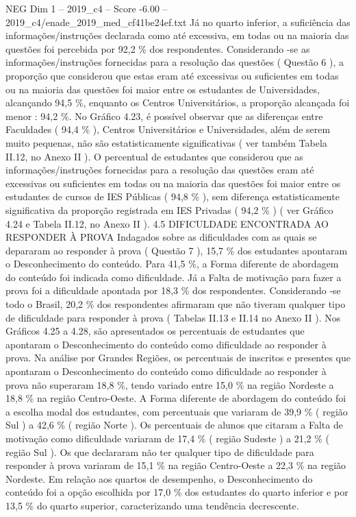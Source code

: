 \begin{textsample}{NEG Dim 1 – 2019\_c4 – Score -6.00 – 2019\_c4/enade\_2019\_med\_cf41be24ef.txt}
Já no quarto inferior, a suficiência das informações/instruções declarada como até excessiva, em todas ou na maioria das questões foi percebida por 92,2 \% dos respondentes.
Considerando -se as informações/instruções fornecidas para a resolução das questões ( Questão 6 ), a proporção que considerou que estas eram até excessivas ou suficientes em todas ou na maioria das questões foi maior entre os estudantes de Universidades, alcançando 94,5 \%, enquanto os Centros Universitários, a proporção alcançada foi menor : 94,2 \%.
No Gráfico 4.23, é possível observar que as diferenças entre Faculdades ( 94,4 \% ), Centros Universitários e Universidades, além de serem muito pequenas, não são estatisticamente significativas ( ver também Tabela II.12, no Anexo II ).
O percentual de estudantes que considerou que as informações/instruções fornecidas para a resolução das questões eram até excessivas ou suficientes em todas ou na maioria das questões foi maior entre os estudantes de cursos de IES Públicas ( 94,8 \% ), sem diferença estatisticamente significativa da proporção registrada em IES Privadas ( 94,2 \% ) ( ver Gráfico 4.24 e Tabela II.12, no Anexo II ). 4.5 DIFICULDADE ENCONTRADA AO RESPONDER À PROVA Indagados sobre as dificuldades com as quais se depararam ao responder à prova ( Questão 7 ), 15,7 \% dos estudantes apontaram o Desconhecimento do conteúdo.
Para 41,5 \%, a Forma diferente de abordagem do conteúdo foi indicada como dificuldade.
Já a Falta de motivação para fazer a prova foi a dificuldade apontada por 18,3 \% dos respondentes.
Considerando -se todo o Brasil, 20,2 \% dos respondentes afirmaram que não tiveram qualquer tipo de dificuldade para responder à prova ( Tabelas II.13 e II.14 no Anexo II ).
Nos Gráficos 4.25 a 4.28, são apresentados os percentuais de estudantes que apontaram o Desconhecimento do conteúdo como dificuldade ao responder à prova.
Na análise por Grandes Regiões, os percentuais de inscritos e presentes que apontaram o Desconhecimento do conteúdo como dificuldade ao responder à prova não superaram 18,8 \%, tendo variado entre 15,0 \% na região Nordeste a 18,8 \% na região Centro-Oeste.
A Forma diferente de abordagem do conteúdo foi a escolha modal dos estudantes, com percentuais que variaram de 39,9 \% ( região Sul ) a 42,6 \% ( região Norte ).
Os percentuais de alunos que citaram a Falta de motivação como dificuldade variaram de 17,4 \% ( região Sudeste ) a 21,2 \% ( região Sul ).
Os que declararam não ter qualquer tipo de dificuldade para responder à prova variaram de 15,1 \% na região Centro-Oeste a 22,3 \% na região Nordeste.
Em relação aos quartos de desempenho, o Desconhecimento do conteúdo foi a opção escolhida por 17,0 \% dos estudantes do quarto inferior e por 13,5 \% do quarto superior, caracterizando uma tendência decrescente.

\end{textsample}
